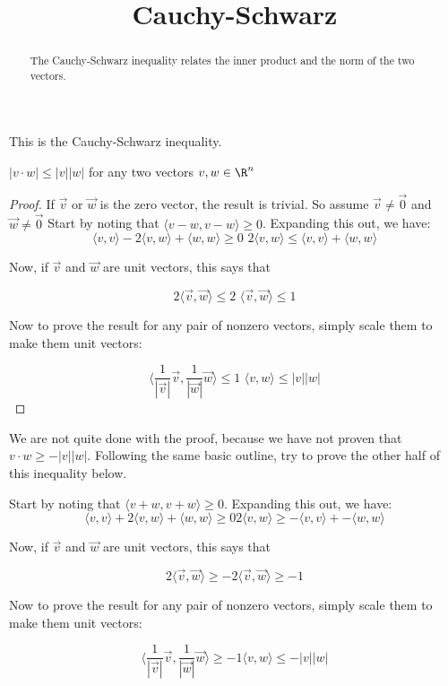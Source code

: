 \documentclass{ximera}
\title{Cauchy-Schwarz}
\begin{document}
\begin{abstract}
  The Cauchy-Schwarz inequality relates the inner product and the norm of the two vectors.
\end{abstract}

This is the Cauchy-Schwarz inequality.

\begin{theorem}
  $|v \cdot w| \leq |v||w|$ for any two vectors $v,w \in \R^n$
\end{theorem} 
 
\begin{proof}
  If $\vec{v}$ or $\vec{w}$ is the zero vector, the result is trivial.  So assume $\vec{v} \neq \vec{0}$ and $\vec{w} \neq \vec{0}$
  Start by noting that $\langle v-w,v-w\rangle \geq 0 $.  Expanding this out, we have:
  \[
  \langle v,v \rangle - 2 \langle v,w \rangle +\langle  w,w\rangle \geq 0 \,\,
  2\langle v,w \rangle \leq \langle v,v \rangle  + \langle w,w\rangle
  \]
  
  Now, if $\vec{v}$ and $\vec{w}$ are unit vectors, this says that
  
  \[
  2\langle \vec{v}, \vec{w} \rangle \leq 2 \,\,
  \langle \vec{v},\vec{w}\rangle \leq 1
  \]
  
  Now to prove the result for any pair of nonzero vectors, simply scale them to make them unit vectors:
  
  \[
  \langle \frac{1}{|\vec{v}|}\vec{v},\frac{1}{|\vec{w}|}\vec{w}\rangle \leq 1\,\,
  \langle v,w\rangle \leq  |v||w|
  \]
  
\end{proof}

We are not quite done with the proof, because we have not proven that $v \cdot w \geq -|v||w|$.  
Following the same basic outline, try to prove the other half of this inequality below.
\begin{free-response}
  Start by noting that $\langle v+w,v+w\rangle \geq 0 $.  Expanding this out, we have:
  \[
  \langle v,v \rangle + 2 \langle v,w \rangle +\langle  w,w\rangle \geq 0
  2\langle v,w \rangle \geq -\langle v,v \rangle  + -\langle w,w\rangle
  \]
  
  Now, if $\vec{v}$ and $\vec{w}$ are unit vectors, this says that
  
  \[
  2\langle \vec{v}, \vec{w} \rangle \geq -2
  \langle \vec{v},\vec{w}\rangle \geq -1
  \]
  
  Now to prove the result for any pair of nonzero vectors, simply scale them to make them unit vectors:
  
  \[
  \langle \frac{1}{|\vec{v}|}\vec{v},\frac{1}{|\vec{w}|}\vec{w}\rangle \geq -1
  \langle v,w\rangle \leq  -|v||w|
  \]
\end{free-response}
\end{document}
